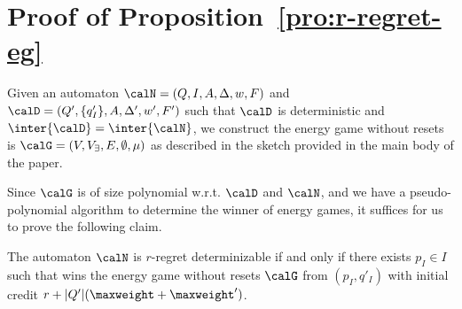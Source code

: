 \documentclass[a4paper]{article}
\begin{document}
\section{Proof of Proposition~\ref{pro:r-regret-eg}}
Given an automaton $\calN = (Q,I,A,\Delta,w,F)$ and $\calD =
(Q',\{q'_I\},A,\Delta',w',F')$ such that $\calD$ is deterministic and
$\inter{\calD} = \inter{\calN}$, we construct the energy game without resets is
$\calG = (V,V_\exists,E, \emptyset,\mu)$ as described in the sketch provided in
the main body of the paper.

Since $\calG$ is of size polynomial w.r.t. $\calD$ and $\calN$, and we have a
pseudo-polynomial algorithm to determine the winner of energy games, it suffices
for us to prove the following claim.
\begin{lemma}
	The automaton $\calN$ is $r$-regret determinizable if and only if
	there exists $p_I \in I$ such that \eve wins the energy game without
	resets $\calG$ from $(p_I,q'_I)$ with initial credit $r +
	|Q'|(\maxweight + \maxweight')$.
\end{lemma}
\end{document}
